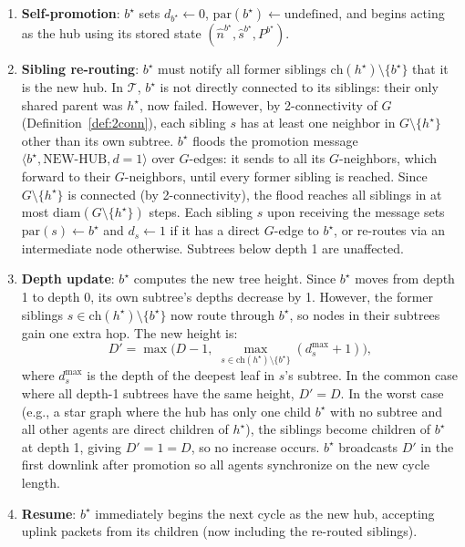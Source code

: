 \documentclass{article}
\begin{document}
\begin{enumerate}
    \item \textbf{Self-promotion}: $b^\star$ sets $d_{b^\star} \leftarrow 0$,
        $\mathrm{par}(b^\star) \leftarrow \text{undefined}$, and begins acting as the
        hub using its stored state $(\hat{n}^{b^\star}, \hat{s}^{b^\star}, P^{b^\star})$.

    \item \textbf{Sibling re-routing}: $b^\star$ must notify all former siblings
        $\mathrm{ch}(h^\star) \setminus \{b^\star\}$ that it is the new hub. In
        $\mathcal{T}$, $b^\star$ is not directly connected to its siblings: their only
        shared parent was $h^\star$, now failed. However, by 2-connectivity of $G$
        (Definition~\ref{def:2conn}), each sibling $s$ has at least one neighbor in
        $G \setminus \{h^\star\}$ other than its own subtree. $b^\star$ floods the
        promotion message $\langle b^\star, \text{NEW-HUB}, d=1 \rangle$ over $G$-edges:
        it sends to all its $G$-neighbors, which forward to their $G$-neighbors, until
        every former sibling is reached. Since $G \setminus \{h^\star\}$ is connected
        (by 2-connectivity), the flood reaches all siblings in at most $\mathrm{diam}(G
        \setminus \{h^\star\})$ steps. Each sibling $s$ upon receiving the message sets
        $\mathrm{par}(s) \leftarrow b^\star$ and $d_s \leftarrow 1$ if it has a direct
        $G$-edge to $b^\star$, or re-routes via an intermediate node otherwise. Subtrees
        below depth 1 are unaffected.

    \item \textbf{Depth update}: $b^\star$ computes the new tree height. Since $b^\star$
        moves from depth 1 to depth 0, its own subtree's depths decrease by 1. However,
        the former siblings $s \in \mathrm{ch}(h^\star) \setminus \{b^\star\}$ now route
        through $b^\star$, so nodes in their subtrees gain one extra hop. The new height
        is:
        \[
            D' = \max\!\bigl(D - 1,\; \max_{s \in \mathrm{ch}(h^\star) \setminus \{b^\star\}} (d_s^{\max} + 1)\bigr),
        \]
        where $d_s^{\max}$ is the depth of the deepest leaf in $s$'s subtree. In the
        common case where all depth-1 subtrees have the same height, $D' = D$. In the
        worst case (e.g., a star graph where the hub has only one child $b^\star$ with no
        subtree and all other agents are direct children of $h^\star$), the siblings
        become children of $b^\star$ at depth 1, giving $D' = 1 = D$, so no increase
        occurs. $b^\star$ broadcasts $D'$ in the first downlink after promotion so all
        agents synchronize on the new cycle length.

    \item \textbf{Resume}: $b^\star$ immediately begins the next cycle as the new hub,
        accepting uplink packets from its children (now including the re-routed siblings).
\end{enumerate}
\end{document}
